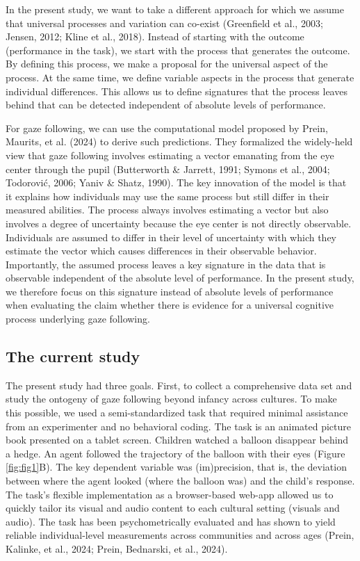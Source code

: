 \documentclass[
  man,floatsintext]{apa7}
\begin{document}
In the present study, we want to take a different approach for which we assume that universal processes and variation can co-exist (Greenfield et al., 2003; Jensen, 2012; Kline et al., 2018). Instead of starting with the outcome (performance in the task), we start with the process that generates the outcome. By defining this process, we make a proposal for the universal aspect of the process. At the same time, we define variable aspects in the process that generate individual differences. This allows us to define signatures that the process leaves behind that can be detected independent of absolute levels of performance.

For gaze following, we can use the computational model proposed by Prein, Maurits, et al. (2024) to derive such predictions. They formalized the widely-held view that gaze following involves estimating a vector emanating from the eye center through the pupil (Butterworth \& Jarrett, 1991; Symons et al., 2004; Todorović, 2006; Yaniv \& Shatz, 1990). The key innovation of the model is that it explains how individuals may use the same process but still differ in their measured abilities. The process always involves estimating a vector but also involves a degree of uncertainty because the eye center is not directly observable. Individuals are assumed to differ in their level of uncertainty with which they estimate the vector which causes differences in their observable behavior. Importantly, the assumed process leaves a key signature in the data that is observable independent of the absolute level of performance. In the present study, we therefore focus on this signature instead of absolute levels of performance when evaluating the claim whether there is evidence for a universal cognitive process underlying gaze following.

\hypertarget{the-current-study}{%
\subsection{The current study}\label{the-current-study}}

The present study had three goals. First, to collect a comprehensive data set and study the ontogeny of gaze following beyond infancy across cultures. To make this possible, we used a semi-standardized task that required minimal assistance from an experimenter and no behavioral coding. The task is an animated picture book presented on a tablet screen. Children watched a balloon disappear behind a hedge. An agent followed the trajectory of the balloon with their eyes (Figure \ref{fig:fig1}B). The key dependent variable was (im)precision, that is, the deviation between where the agent looked (where the balloon was) and the child's response. The task's flexible implementation as a browser-based web-app allowed us to quickly tailor its visual and audio content to each cultural setting (visuals and audio). The task has been psychometrically evaluated and has shown to yield reliable individual-level measurements across communities and across ages (Prein, Kalinke, et al., 2024; Prein, Bednarski, et al., 2024).
\end{document}
